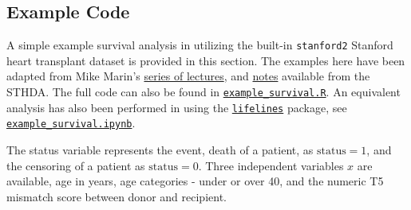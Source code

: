 \subsection{Example \R Code}
\label{additional:Survival:Rcode}

A simple example survival analysis in \R utilizing the built-in
\texttt{stanford2} Stanford heart transplant dataset is provided in this section.
The examples here have been adapted from Mike Marin's
\href{https://www.youtube.com/playlist?list=PLqzoL9-eJTNDdnKvep_YHIwk2AMqHhuJ0}{series of lectures},
and \href{http://www.sthda.com/english/wiki/cox-model-assumptions}{notes} available from the STHDA.
The full \R code can also be found in
\href{https://github.com/mepland/data_science_notes/blob/main/sections/appendixes/additional/example_survival.R}{\texttt{example\_survival.R}}.
An equivalent analysis has also been performed in \python using the
\href{https://lifelines.readthedocs.io/en/latest}{\texttt{lifelines}} package,
see
\href{https://github.com/mepland/data_science_notes/blob/main/sections/appendixes/additional/example_survival.ipynb}{\texttt{example\_survival.ipynb}}.

The status variable represents the event, death of a patient, as $\text{status}=1$,
and the censoring of a patient as $\text{status}=0$.
Three independent variables $x$ are available,
age in years,
age categories - under or over 40,
and the numeric T5 mismatch score between donor and recipient.

